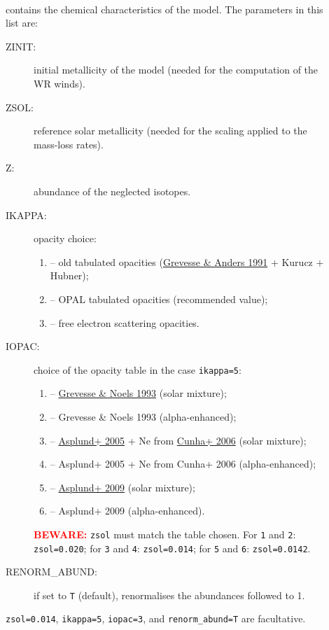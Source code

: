 \documentclass[11pt]{article}
\begin{document}
\begin{description}
  \item[] ~\\ contains the chemical characteristics of the model. The parameters in this list are:
    \begin{description}
      \item[ZINIT:] initial metallicity of the model (needed for the computation of the WR winds).
      \item[ZSOL:] reference solar metallicity (needed for the scaling applied to the mass-loss rates).
      \item[Z:] abundance of the neglected isotopes.
      \item[IKAPPA:] opacity choice:
        \begin{enumerate}[labelindent=.5cm,font=\ttfamily \bfseries,label=\arabic*:]
          \item[1] -- old tabulated opacities (\href{https://ui.adsabs.harvard.edu/abs/1991sia..book.1227G}{Grevesse \& Anders 1991} + Kurucz + Hubner);
          \item[5] -- OPAL tabulated opacities (recommended value);
          \item[9] -- free electron scattering opacities.
        \end{enumerate}
      \item[IOPAC:] choice of the opacity table in the case \texttt{ikappa=5}:
        \begin{enumerate}[labelindent=.5cm,font=\ttfamily \bfseries,label=\arabic*]
          \item[1] -- \href{https://ui.adsabs.harvard.edu/abs/1993oee..conf...15G}{Grevesse \& Noels 1993} (solar mixture);
          \item[2] -- Grevesse \& Noels 1993 (alpha-enhanced);
          \item[3] -- \href{https://ui.adsabs.harvard.edu/abs/2005ASPC..336...25A}{Asplund+ 2005} + Ne from \href{https://ui.adsabs.harvard.edu/abs/2006ApJ...647L.143C}{Cunha+ 2006} (solar mixture);
          \item[4] -- Asplund+ 2005 + Ne from Cunha+ 2006 (alpha-enhanced);
          \item[5] -- \href{https://ui.adsabs.harvard.edu/abs/2009ARA&A..47..481A}{Asplund+ 2009} (solar mixture);
          \item[6] -- Asplund+ 2009 (alpha-enhanced).
        \end{enumerate}
      \textcolor{red}{\bf BEWARE:} \texttt{zsol} must match the table chosen. For \texttt{1} and \texttt{2}: \texttt{zsol=0.020}; for \texttt{3} and \texttt{4}: \texttt{zsol=0.014}; for \texttt{5} and \texttt{6}: \texttt{zsol=0.0142}.
      \item[RENORM\_ABUND:] if set to \texttt{T} (default), renormalises the abundances followed to 1.
    \end{description}
    \texttt{zsol=0.014}, \texttt{ikappa=5},  \texttt{iopac=3}, and \texttt{renorm\_abund=T} are facultative.


\end{description}
\end{document}
